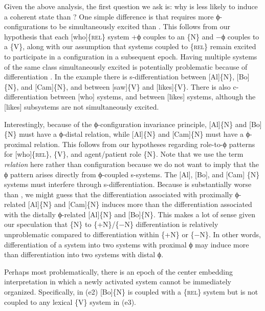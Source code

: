   Given the above analysis, the first question we ask is: why is  less likely to induce a coherent state than ? One simple difference is that  requires more ϕ-con\-fi\-gu\-ra\-tions to be simultaneously excited than . This follows from our hypothesis that each [who]\{\textsc{rel}\} system +ϕ couples to an \{N\} and −ϕ couples to a \{V\}, along with our assumption that systems coupled to \{\textsc{rel}\} remain excited to participate in a configuration in a subsequent epoch. Having multiple systems of the same class simultaneously excited is potentially problematic because of differentiation . In the example there is s-differentiation  between [Al]\{N\}, [Bo]\{N\}, and [Cam]\{N\}, and between [saw]\{V\} and [likes]\{V\}. There is also c-differentiation  between [who] systems, and between [likes] systems, although the [likes] subsystems are not simultaneously excited. 

  Interestingly, because of the ϕ-con\-fi\-gu\-ra\-tion invariance principle, [Al]\{N\} and [Bo]\{N\} must have a ϕ-distal relation, while [Al]\{N\} and [Cam]\{N\} must have a ϕ-proximal relation. This follows from our hypotheses regarding role-to-ϕ patterns for [who]\{\textsc{rel}\},  \{V\}, and agent/patient role \{N\}. Note that we use the term \textit{relation} here rather than configuration because we do not want to imply that the ϕ pattern arises directly from ϕ-coupled s-sys\-tems. The [Al], [Bo], and [Cam] \{N\} systems must interfere through s-differentiation. Because  is substantially worse than , we might guess that the differentiation associated with proximally ϕ-related [Al]\{N\} and [Cam]\{N\} induces more  than the differentiation associated with the distally ϕ-related [Al]\{N\} and [Bo]\{N\}. This makes a lot of sense given our speculation that \{N\} to \{+N\}/\{−N\} differentiation is relatively unproblematic compared to differentiation within \{+N\} or \{−N\}. In other words, differentiation of a system into two systems with proximal ϕ may induce more  than differentiation into two systems with distal ϕ.

  Perhaps most problematically, there is an epoch of the center embedding interpretation in which a newly activated system cannot be immediately organized. Specifically, in (e2) [Bo]\{N\} is coupled with a \{\textsc{rel}\} system but is not coupled to any lexical \{V\} system in (e3). 

